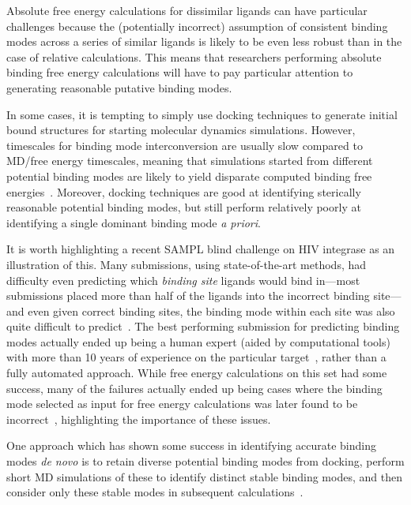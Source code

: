 \documentclass[9pt,bestpractices,pubversion]{livecoms}
\begin{document}
Absolute free energy calculations for dissimilar ligands can have particular challenges because the (potentially incorrect) assumption of consistent binding modes across a series of similar ligands is likely to be even less robust than in the case of relative calculations.
This means that researchers performing absolute binding free energy calculations will have to pay particular attention to generating reasonable putative binding modes.

In some cases, it is tempting to simply use docking techniques to generate initial bound structures for starting molecular dynamics simulations.
However, timescales for binding mode interconversion are usually slow compared to MD/free energy timescales, meaning that simulations started from different potential binding modes are likely to yield disparate computed binding free energies~\cite{mobley2006use, palma2012computation, mobley2012perspective, gill2018binding}. Moreover, docking techniques are good at identifying sterically reasonable potential binding modes, but still perform relatively poorly at identifying a single dominant binding mode \emph{a priori}. 


It is worth highlighting a recent SAMPL blind challenge on HIV integrase as an illustration of this. 
Many submissions, using state-of-the-art methods, had difficulty even predicting which \emph{binding site} ligands would bind in---most submissions placed more than half of the ligands into the incorrect binding site---and even given correct binding sites, the binding mode within each site was also quite difficult to predict~\cite{mobley2014blind}.
The best performing submission for predicting binding modes actually ended up being a human expert (aided by computational tools) with more than 10 years of experience on the particular target~\cite{voet2014combining}, rather than a fully automated approach.
While free energy calculations on this set had some success, many of the failures actually ended up being cases where the binding mode selected as input for free energy calculations was later found to be incorrect~\cite{gallicchio2014virtual}, highlighting the importance of these issues.

One approach which has shown some success in identifying accurate binding modes \emph{de novo} is to retain diverse potential binding modes from docking, perform short MD simulations of these to identify distinct stable binding modes, and then consider only these stable modes in subsequent calculations~\cite{gallicchio2014virtual, mobley2006use,rocklin2013blind, boyce2009predicting, mobley2007predicting}.
\end{document}
